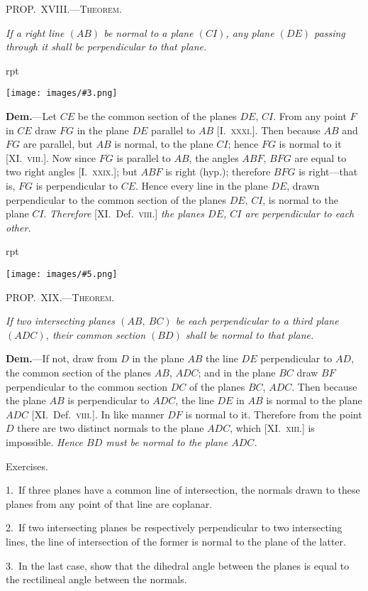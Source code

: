 \documentclass[oneside]{book}
\newcounter{wrapwidth}
\newcommand\mypropl[2]{
\bigskip\Needspace*{4\baselineskip}\begin{center}\textsc{#1}\end{center}
\hspace{\parindent}\emph{#2}\par\medskip
}
\newcommand\mypropflot[5]{
\vspace{0.5\baselineskip}
\bigskip\Needspace*{4\baselineskip}
\setcounter{wrapwidth}{#3}
\begin{wrapfigure}[#4]{r}{\value{wrapwidth}pt}
\begin{center}
\vspace{-0.3in}
\texttt{[image: images/\#5.png]}
\end{center}
\end{wrapfigure}
\hspace{1.5\parindent}\textsc{#1}\par\medskip
\indent\emph{#2}\par\medskip
}
\newcommand\exhead[1]{
\Needspace*{5\baselineskip}\begin{center}
\textsf{#1}
\end{center}
}
\newcommand\imgflow[3]{
\setcounter{wrapwidth}{#1}
\begin{wrapfigure}[#2]{r}{\value{wrapwidth}pt}
\begin{center}
\vspace{-0.3in}
\texttt{[image: images/\#3.png]}
\end{center}
\end{wrapfigure}
}
\begin{document}
\mypropl{PROP\@.~XVIII\@.---Theorem.}{If a right line $(AB)$ be normal to a plane $(CI)$, \emph{any}
plane $(DE)$ passing through it shall be perpendicular to
that plane.}

\imgflow{160}{9}{f232}

\textbf{Dem.}---Let $CE$ be the common section of the planes
$DE$, $CI$. From any point
$F$ in $CE$ draw $FG$ in
the plane $DE$ parallel
to $AB$ [I.~\textsc{xxxi.}]. Then
because $AB$ and $FG$ are
parallel, but $AB$ is normal,
to the plane $CI$;
hence $FG$ is normal to it
[XI\@.~\textsc{viii.}]. Now since
$FG$ is parallel to $AB$, the angles $ABF$, $BFG$ are equal
to two right angles [I.~\textsc{xxix.}]; but $ABF$ is right
(hyp.); therefore $BFG$ is right---that is, $FG$ is perpendicular
to $CE$. Hence every line in the plane $DE$,
drawn perpendicular to the common section of the
planes $DE$, $CI$, is normal to the plane $CI$. \emph{Therefore}
[XI\@.\ Def.~\textsc{viii.}] \emph{the planes $DE$, $CI$ are perpendicular to
each other.}


\mypropflot{PROP\@.~XIX\@.---Theorem.}{If two intersecting planes $(AB,\ BC)$ be each perpendicular
to a third plane $(ADC)$, their common section $(BD)$
shall be normal to that plane.}{115}{11}{f233}

\textbf{Dem.}---If not, draw from $D$ in the plane $AB$ the
line $DE$ perpendicular to $AD$,
the common section of the planes
$AB$, $ADC$; and in the plane $BC$
draw $BF$ perpendicular to the
common section $DC$ of the planes
$BC$, $ADC$. Then because the
plane $AB$ is perpendicular to
$ADC$, the line $DE$ in $AB$ is
normal to the plane $ADC$ [XI\@.\ Def.~\textsc{viii.}].
In like manner $DF$
is normal to it. Therefore from
the point $D$ there are two distinct normals to the
plane $ADC$, which [XI\@.~\textsc{xiii.}] is impossible. \emph{Hence
$BD$ must be normal to the plane $ADC$.}


\exhead{Exercises.}

\begin{footnotesize}
1.~If three planes have a common line of intersection, the normals
drawn to these planes from any point of that line are coplanar.

2.~If two intersecting planes be respectively perpendicular to
two intersecting lines, the line of intersection of the former is
normal to the plane of the latter.

3.~In the last case, show that the dihedral angle between the
planes is equal to the rectilineal angle between the normals.
\par\end{footnotesize}
\end{document}

